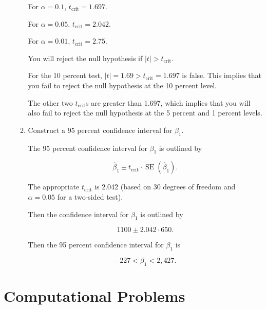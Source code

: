 \documentclass[11pt]{article}
\begin{document}
\begin{onehalfspacing}
\begin{enumerate}
\begin{enumerate}
{		For  $\alpha = 0.1$, $t_{\text{crit}} = 1.697$.
		
		For  $\alpha = 0.05$, $t_{\text{crit}} = 2.042$.
		
		For  $\alpha = 0.01$, $t_{\text{crit}} = 2.75$.
		
		You will reject the null hypothesis if $|t| > t_{\text{crit}}$.
		
		For the 10 percent test, $|t| = 1.69 > t_{\text{crit}} = 1.697$ is false. This implies that you fail to reject the null hypothesis at the 10 percent level.
		
		The other two $t_{\text{crit}}$s are greater than 1.697, which implies that you will also fail to reject the null hypothesis at the 5 percent and 1 percent levels.\\
	}

	\item  Construct a 95 percent confidence interval for $\beta_1$.\\
	
		{\color{pine_green}
		The 95 percent confidence interval for $\beta_1$ is outlined by 
		
		$$\hat{\beta}_1 \pm t_{\text{crit}} \cdot \mathop{\text{SE}}(\hat{\beta}_1).$$
		
		The appropriate $t_{\text{crit}}$ is 2.042 (based on 30 degrees of freedom and $\alpha = 0.05$ for a two-sided test).
		
		Then the confidence interval for $\beta_1$ is outlined by
		
		$$1100 \pm 2.042 \cdot 650.$$
		
		Then the 95 percent confidence interval for $\beta_1$ is 
		
		$$-227 < \beta_1 < 2,427.$$
		

	}

\end{enumerate}

\end{enumerate}

\clearpage

\section*{Computational Problems}


\end{onehalfspacing}
\end{document}
